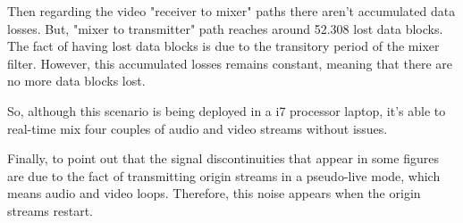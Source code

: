 Then regarding the video "receiver to mixer" paths there aren't accumulated data losses. But, "mixer to transmitter" path reaches around 52.308 lost data blocks. The fact of having lost data blocks is due to the transitory period of the mixer filter. However, this accumulated losses remains constant, meaning that there are no more data blocks lost.

So, although this scenario is being deployed in a i7 processor laptop, it's able to real-time mix four couples of audio and video streams without issues.

Finally, to point out that the signal discontinuities that appear in some figures are due to the fact of transmitting origin streams in a pseudo-live mode, which means audio and video loops. Therefore, this noise appears when the origin streams restart.
